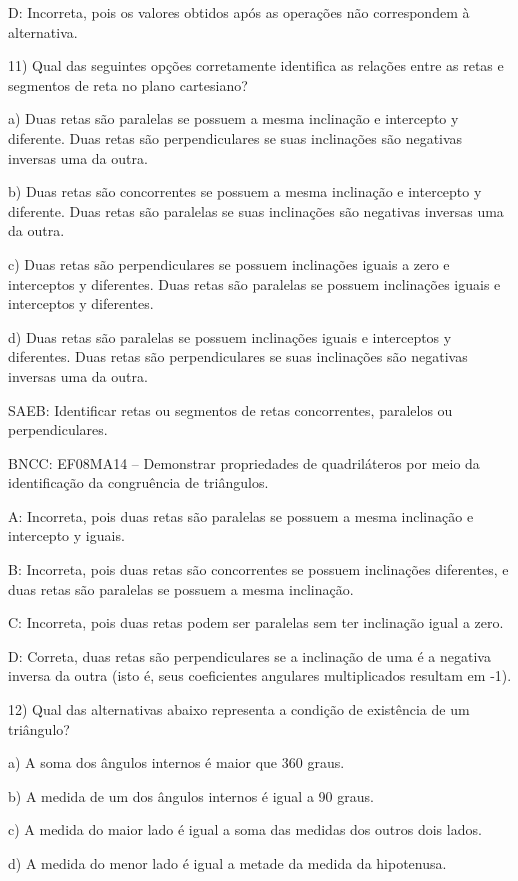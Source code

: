 D: Incorreta, pois os valores obtidos após as operações não correspondem
à alternativa.

11) Qual das seguintes opções corretamente identifica as relações entre
as retas e segmentos de reta no plano cartesiano?

a) Duas retas são paralelas se possuem a mesma inclinação e intercepto y
diferente. Duas retas são perpendiculares se suas inclinações são
negativas inversas uma da outra.

b) Duas retas são concorrentes se possuem a mesma inclinação e
intercepto y diferente. Duas retas são paralelas se suas inclinações são
negativas inversas uma da outra.

c) Duas retas são perpendiculares se possuem inclinações iguais a zero e
interceptos y diferentes. Duas retas são paralelas se possuem
inclinações iguais e interceptos y diferentes.

d) Duas retas são paralelas se possuem inclinações iguais e interceptos
y diferentes. Duas retas são perpendiculares se suas inclinações são
negativas inversas uma da outra.

SAEB: Identificar retas ou segmentos de retas concorrentes, paralelos ou
perpendiculares.

BNCC: EF08MA14 -- Demonstrar propriedades de quadriláteros por meio da
identificação da congruência de triângulos.

A: Incorreta, pois duas retas são paralelas se possuem a mesma
inclinação e intercepto y iguais.

B: Incorreta, pois duas retas são concorrentes se possuem inclinações
diferentes, e duas retas são paralelas se possuem a mesma inclinação.

C: Incorreta, pois duas retas podem ser paralelas sem ter inclinação
igual a zero.

D: Correta, duas retas são perpendiculares se a inclinação de uma é a
negativa inversa da outra (isto é, seus coeficientes angulares
multiplicados resultam em -1).

12) Qual das alternativas abaixo representa a condição de existência de
um triângulo?

a) A soma dos ângulos internos é maior que 360 graus.

b) A medida de um dos ângulos internos é igual a 90 graus.

c) A medida do maior lado é igual a soma das medidas dos outros dois
lados.

d) A medida do menor lado é igual a metade da medida da hipotenusa.


